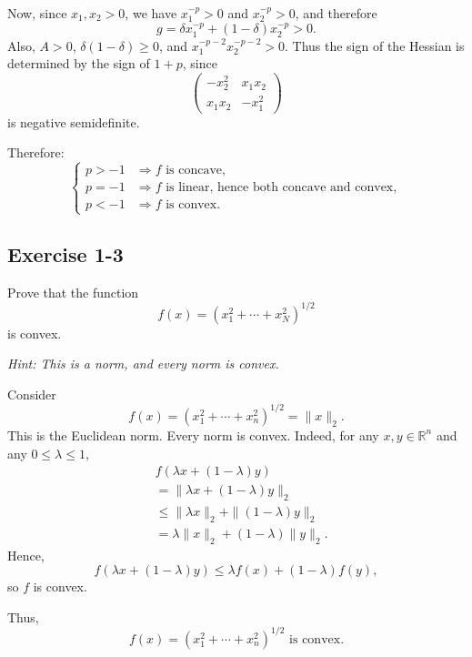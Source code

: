 Now, since \(x_1,x_2>0\), we have \(x_1^{-p}>0\) and \(x_2^{-p}>0\), and therefore
\[
g=\delta x_1^{-p}+(1-\delta)x_2^{-p}>0.
\]
Also, \(A>0\), \(\delta(1-\delta)\ge 0\), and \(x_1^{-p-2}x_2^{-p-2}>0\). Thus the sign of the Hessian is determined by the sign of \(1+p\), since
\[
\begin{pmatrix}
-x_2^2 & x_1x_2\\
x_1x_2 & -x_1^2
\end{pmatrix}
\]
is negative semidefinite.

Therefore:
\[
\boxed{
\begin{cases}
p>-1 &\Rightarrow f \text{ is concave},\\[1mm]
p=-1 &\Rightarrow f \text{ is linear, hence both concave and convex},\\[1mm]
p<-1 &\Rightarrow f \text{ is convex}.
\end{cases}}
\]




\vspace{30pt}
\begin{tcolorbox}[breakable]

\subsection*{Exercise 1-3}

Prove that the function
\[
f(x) = \left(x_1^2 + \cdots + x_N^2\right)^{1/2}
\]
is convex.

\textit{Hint: This is a norm, and every norm is convex.}

\end{tcolorbox}



Consider
\[
f(x)=\left(x_1^2+\cdots+x_n^2\right)^{1/2}=\|x\|_2.
\]
This is the Euclidean norm. Every norm is convex. Indeed, for any \(x,y\in\mathbb{R}^n\) and any \(0\le \lambda \le 1\),
\[
\begin{aligned}
&f(\lambda x+(1-\lambda)y)\\
&=
\|\lambda x+(1-\lambda)y\|_2\\
&\le
\|\lambda x\|_2+\|(1-\lambda)y\|_2\\
&=
\lambda \|x\|_2+(1-\lambda)\|y\|_2.
\end{aligned}
\]
Hence,
\[
f(\lambda x+(1-\lambda)y)\le \lambda f(x)+(1-\lambda)f(y),
\]
so \(f\) is convex.

Thus,
\[
\boxed{
f(x)=\left(x_1^2+\cdots+x_n^2\right)^{1/2}
\text{ is convex.}}
\]





